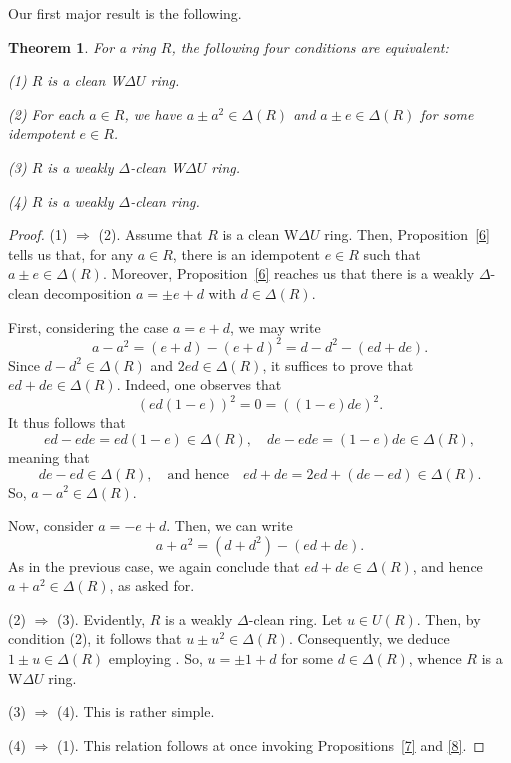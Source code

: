 \documentclass[12pt]{amsart}
\newtheorem{theorem}{Theorem}[section]
\theoremstyle{definition}
\begin{document}
Our first major result is the following.

\begin{theorem}\label{9}
For a ring \( R \), the following four conditions are equivalent:

(1) \( R \) is a clean W\( \Delta U \) ring.

(2) For each \( a \in R \), we have \( a \pm a^2 \in \Delta(R) \) and \( a \pm e \in \Delta(R) \) for some idempotent \( e \in R \).

(3) \( R \) is a weakly \( \Delta \)-clean W\( \Delta U \) ring.

(4) \( R \) is a weakly \( \Delta \)-clean ring.
\end{theorem}

\begin{proof}
(1) \( \Rightarrow \) (2). Assume that \( R \) is a clean W\( \Delta U \) ring. Then, Proposition~\ref{6} tells us that, for any \( a \in R \), there is an idempotent \( e \in R \) such that \( a \pm e \in \Delta(R) \). Moreover,  Proposition~\ref{6} reaches us that there is a weakly \( \Delta \)-clean decomposition \( a = \pm e + d \) with \( d \in \Delta(R) \).

First, considering the case \( a = e + d \), we may write
\[
a - a^2 = (e + d) - (e + d)^2 = d - d^2 - (ed + de).
\]
Since \( d - d^2 \in \Delta(R) \) and \( 2ed \in \Delta(R) \), it suffices to prove that \( ed + de \in \Delta(R) \). Indeed, one observes that
\[
(ed(1 - e))^2 = 0 = ((1 - e)de)^2.
\]
It thus follows that
\[
ed - ede = ed(1 - e) \in \Delta(R), \quad de - ede = (1 - e)de \in \Delta(R),
\]
meaning that
\[
de - ed \in \Delta(R), \quad \text{and hence} \quad ed + de = 2ed + (de - ed) \in \Delta(R).
\]
So, \( a - a^2 \in \Delta(R) \).

Now, consider \( a = -e + d \). Then, we can write
\[
a + a^2 = (d + d^2) - (ed + de).
\]
As in the previous case, we again conclude that \( ed + de \in \Delta(R) \), and hence \( a + a^2 \in \Delta(R) \), as asked for.

(2) \( \Rightarrow \) (3). Evidently, \( R \) is a weakly \( \Delta \)-clean ring. Let \( u \in U(R) \). Then, by condition (2), it follows that \( u \pm u^2 \in \Delta(R) \). Consequently, we deduce \( 1 \pm u \in \Delta(R) \) employing \cite[Lemma 1(2)]{2}. So, \( u = \pm1 + d \) for some \( d \in \Delta(R) \), whence \( R \) is a W\( \Delta U \) ring.

(3) \( \Rightarrow \) (4). This is rather simple.

(4) \( \Rightarrow \) (1). This relation follows at once invoking Propositions~\ref{7} and \ref{8}.
\end{proof}
\end{document}
